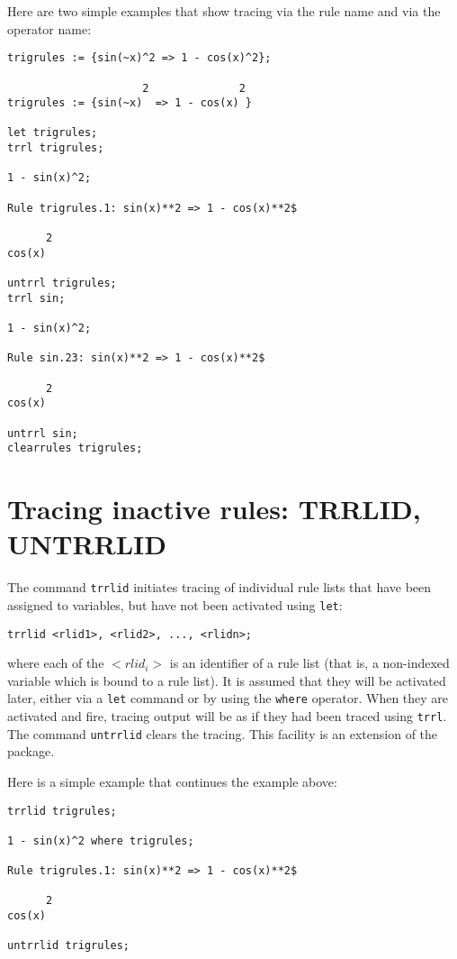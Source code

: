 Here are two simple examples that show tracing via the rule name and
via the operator name:
\begin{verbatim}
trigrules := {sin(~x)^2 => 1 - cos(x)^2};

                     2              2
trigrules := {sin(~x)  => 1 - cos(x) }

let trigrules;
trrl trigrules;

1 - sin(x)^2;

Rule trigrules.1: sin(x)**2 => 1 - cos(x)**2$

      2
cos(x)

untrrl trigrules;
trrl sin;

1 - sin(x)^2;

Rule sin.23: sin(x)**2 => 1 - cos(x)**2$

      2
cos(x)

untrrl sin;
clearrules trigrules;
\end{verbatim}

\section{Tracing inactive rules: TRRLID, UNTRRLID}

\hypertarget{command:TRRLID}{}
\hypertarget{command:UNTRRLID}{}
The command \texttt{trrlid} initiates tracing of individual rule lists
that have been assigned to variables, but have not been activated
using \texttt{let}:
\begin{verbatim}
trrlid <rlid1>, <rlid2>, ..., <rlidn>;
\end{verbatim}
where each of the $<rlid_i>$ is an identifier of a rule list (that is,
a non-indexed variable which is bound to a rule list).  It is assumed
that they will be activated later, either via a \texttt{let} command
or by using the \texttt{where} operator.  When they are activated and
fire, tracing output will be as if they had been traced using
\texttt{trrl}.  The command \texttt{untrrlid} clears the tracing.
This facility is an extension of the \rdebug{} package.

Here is a simple example that continues the example above:
\begin{verbatim}
trrlid trigrules;

1 - sin(x)^2 where trigrules;

Rule trigrules.1: sin(x)**2 => 1 - cos(x)**2$

      2
cos(x)

untrrlid trigrules;
\end{verbatim}

